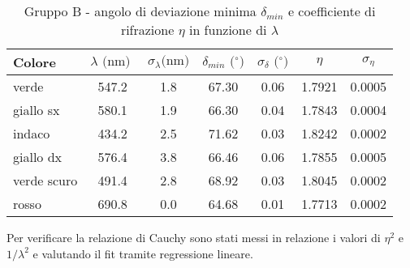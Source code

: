 \begin{table}[!htbp]
    {\par\centering
    \begin{tabular}{lcccccc}
        \hline
            Colore & 
            $\lambda \text{ (nm) }$ &
            $\sigma_{\lambda} \text{(nm)}$ & 
            $\delta_{min} \text{ ($^{\circ}$)}$ &
            $\sigma_{\delta} \text{ ($^{\circ}$)}$ &
            $\eta$ &
            $\sigma_{\eta}$ \\
        \hline
        verde        &   547.2  & 1.8 & 67.30 & 0.06 &  1.7921 &   0.0005 \\
        giallo sx    &   580.1  & 1.9 & 66.30 & 0.04 &  1.7843 &   0.0004 \\
        indaco       &   434.2  & 2.5 & 71.62 & 0.03 &  1.8242 &   0.0002 \\
        giallo dx    &   576.4  & 3.8 & 66.46 & 0.06 &  1.7855 &   0.0005 \\
        verde scuro  &   491.4  & 2.8 & 68.92 & 0.03 &  1.8045 &   0.0002 \\
        rosso        &   690.8  & 0.0 & 64.68 & 0.01 &  1.7713 &   0.0002 \\
        \hline
    \end{tabular}
    \par}
    \caption{Gruppo B - angolo di deviazione minima $\delta_{min}$ e coefficiente di rifrazione $\eta$ in funzione di $\lambda$} \label{table:tbl11}
\end{table}

Per verificare la relazione di Cauchy sono stati messi in relazione i valori di $\eta^2$ e $1/\lambda^2$
e valutando il fit tramite regressione lineare.


